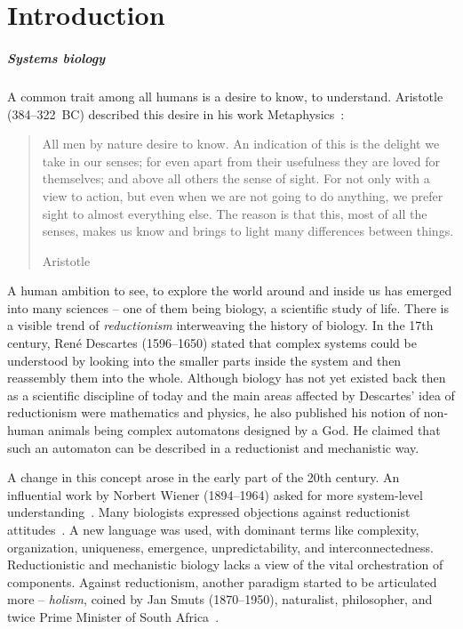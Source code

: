 \documentclass[
	digital, oneside, nosansbold, nocolorbold, nolot, nolof
]{fithesis4}
\begin{document}
\chapter{Introduction}

\paragraph{Systems biology}

A common trait among all humans is a desire to know, to understand. Aristotle
(384--322~BC) described this desire in his work Metaphysics~\cite{aristotle}:

\blockquote[Aristotle]{All men by nature desire to know. An indication of this
    is the delight we take in our senses; for even apart from their usefulness
    they are loved for themselves; and above all others the sense of sight. For
    not only with a view to action, but even when we are not going to do
    anything, we prefer sight to almost everything else. The reason is that
    this, most of all the senses, makes us know and brings to light many
    differences between things.}

A human ambition to see, to explore the world around and inside us has emerged
into many sciences -- one of them being biology, a scientific study of life.
There is a visible trend of \emph{reductionism} interweaving the history of
biology. In the 17th century, René Descartes (1596--1650) stated that complex
systems could be understood by looking into the smaller parts inside the system
and then reassembly them into the whole. Although biology has not yet existed
back then as a scientific discipline of today and the main areas affected by
Descartes' idea of reductionism were mathematics and physics, he also published
his notion of non-human animals being complex automatons designed by a God. He
claimed that such an automaton can be described in a reductionist and
mechanistic way.~\cite{systems_bio_hist, de_homine}

A change in this concept arose in the early part of the 20th century. An
influential work by Norbert Wiener (1894--1964) asked for more system-level
understanding~\cite{cybernetics}.  Many biologists expressed objections against
reductionist attitudes~\cite{woodger_biological, weiss_problem, ludwig_open}. A
new language was used, with dominant terms like complexity, organization,
uniqueness, emergence, unpredictability, and interconnectedness. Reductionistic
and mechanistic biology lacks a view of the vital orchestration of components.
Against reductionism, another paradigm started to be articulated more --
\emph{holism}, coined by Jan Smuts (1870--1950), naturalist, philosopher, and
twice Prime Minister of South Africa~\cite{smuts_holism}.
\end{document}
